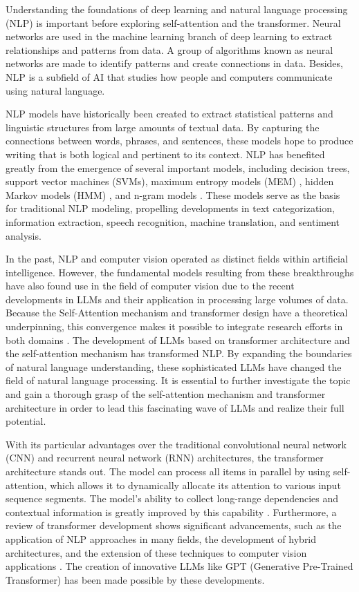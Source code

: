 Understanding the foundations of deep learning and natural language processing (NLP) is important before exploring self-attention and the transformer. Neural networks are used in the machine learning branch of deep learning to extract relationships and patterns from data. A group of algorithms known as neural networks are made to identify patterns and create connections in data. Besides, NLP is a subfield of AI that studies how people and computers communicate using natural language.

NLP models have historically been created to extract statistical patterns and linguistic structures from large amounts of textual data. By capturing the connections between words, phrases, and sentences, these models hope to produce writing that is both logical and pertinent to its context. NLP has benefited greatly from the emergence of several important models, including decision trees, support vector machines (SVMs), maximum entropy models (MEM) \cite{berger1996}, hidden Markov models (HMM) \cite{rabiner1989}, and n-gram models \cite{jelinek1980}. These models serve as the basis for traditional NLP modeling, propelling developments in text categorization, information extraction, speech recognition, machine translation, and sentiment analysis.

In the past, NLP and computer vision operated as distinct fields within artificial intelligence. However, the fundamental models resulting from these breakthroughs have also found use in the field of computer vision due to the recent developments in LLMs and their application in processing large volumes of data. Because the Self-Attention mechanism and transformer design have a theoretical underpinning, this convergence makes it possible to integrate research efforts in both domains \cite{Vaswani2017}. The development of LLMs based on transformer architecture and the self-attention mechanism has transformed NLP. By expanding the boundaries of natural language understanding, these sophisticated LLMs have changed the field of natural language processing. It is essential to further investigate the topic and gain a thorough grasp of the self-attention mechanism and transformer architecture in order to lead this fascinating wave of LLMs and realize their full potential.

With its particular advantages over the traditional convolutional neural network (CNN) and recurrent neural network (RNN) architectures, the transformer architecture stands out. The model can process all items in parallel by using self-attention, which allows it to dynamically allocate its attention to various input sequence segments. The model's ability to collect long-range dependencies and contextual information is greatly improved by this capability \cite{Vaswani2017}. Furthermore, a review of transformer development shows significant advancements, such as the application of NLP approaches in many fields, the development of hybrid architectures, and the extension of these techniques to computer vision applications \cite{dosovitskiy2020}. The creation of innovative LLMs like GPT \cite{radford2019} (Generative Pre-Trained Transformer) has been made possible by these developments.


